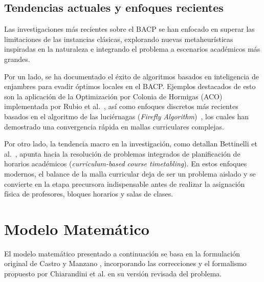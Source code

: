 \documentclass[letter, 10pt]{article}
\begin{document}
\subsection{Tendencias actuales y enfoques recientes}
Las investigaciones m\'as recientes sobre el BACP se han enfocado en superar las limitaciones de las instancias cl\'asicas, explorando nuevas metaheur\'isticas inspiradas en la naturaleza e integrando el problema a escenarios acad\'emicos m\'as grandes. 

Por un lado, se ha documentado el \'exito de algoritmos basados en inteligencia de enjambres para evadir \'optimos locales en el BACP. Ejemplos destacados de esto son la aplicaci\'on de la Optimizaci\'on por Colonia de Hormigas (ACO) implementada por Rubio et al.~\cite{rubio2013}, as\'i como enfoques discretos m\'as recientes basados en el algoritmo de las luci\'ernagas (\textit{Firefly Algorithm})~\cite{Firefly2023}, los cuales han demostrado una convergencia r\'apida en mallas curriculares complejas.

Por otro lado, la tendencia macro en la investigaci\'on, como detallan Bettinelli et al.~\cite{Bettinelli2015}, apunta hacia la resoluci\'on de problemas integrados de planificaci\'on de horarios acad\'emicos (\textit{curriculum-based course timetabling}). En estos enfoques modernos, el balance de la malla curricular deja de ser un problema aislado y se convierte en la etapa precursora indispensable antes de realizar la asignaci\'on f\'isica de profesores, bloques horarios y salas de clases.
\section{Modelo Matem\'{a}tico}

El modelo matem\'{a}tico presentado a continuaci\'{o}n se basa en la formulaci\'{o}n original de Castro y Manzano \cite{Castro2001}, incorporando las correcciones y el formalismo propuesto por Chiarandini et al. \cite{Chiarandini2012} en su versi\'{o}n revisada del problema.
\end{document}
